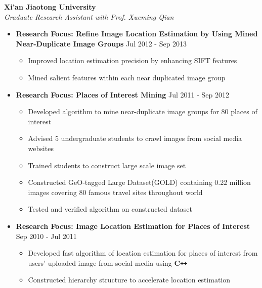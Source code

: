 \documentclass[10pt]{article}
\newenvironment{outerlist}[1][\enskip\textbullet]%
        {\begin{itemize}[#1,leftmargin=*]}{\end{itemize}%
         \vspace{-1.2\baselineskip}}
\newenvironment{innerlist}[1][\enskip\textbullet]%
        {\begin{itemize}[#1,leftmargin=*,parsep=0pt,itemsep=0pt,topsep=0pt,partopsep=0pt]}
        {\end{itemize}}
\begin{document}
\textbf{Xi'an Jiaotong University } \\
\emph{Graduate Research Assistant with Prof. Xueming Qian}
\begin{outerlist}
\vspace{-.1in}

        \item[] \textbf{Research Focus: Refine Image Location Estimation by Using Mined Near-Duplicate Image Groups}  \hfill {Jul 2012 - Sep 2013}
        \begin{innerlist}
\vspace{-.05in} 
        \item Improved location estimation precision by enhancing SIFT features
        \item Mined salient features within each near duplicated image group 
        \end{innerlist}

        \item[] \textbf{Research Focus: Places of Interest Mining} \hfill {Jul 2011 - Sep 2012}
        \begin{innerlist}
\vspace{-.05in}
        \item Developed algorithm to mine near-duplicate image groups for 80 places of interest
	\item Advised $5$ undergraduate students to crawl images from social media websites
	\item Trained students to construct large scale image set 
        \item Constructed GeO-tagged Large Dataset(GOLD) containing 0.22 million images covering 80 famous travel sites throughout world
        \item Tested and verified algorithm  on constructed dataset 
        \end{innerlist}

        
        \item[] \textbf{Research Focus: Image Location Estimation for Places of Interest}  \hfill {Sep 2010 - Jul 2011}
        \begin{innerlist}
\vspace{-.05in}
        \item Developed fast algorithm of location estimation for places of interest from users' uploaded image from social media using \textbf{C\texttt{++}}
        \item Constructed hierarchy structure to accelerate location estimation
        \end{innerlist}
        
\vspace{.15in}
\end{outerlist}
\end{document}
